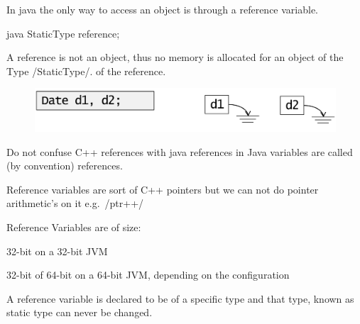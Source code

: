 \begin{defnbox}\nospacing
  \begin{defn}\label{defn:referenceVariable}
    In java the only way to access an object is through a reference variable.
    \begin{mintlinebox}{java}
      StaticType reference;
    \end{mintlinebox}
    A reference is not an object, thus no memory is allocated for an object of
    the Type \javainline/StaticType/.
    of the reference.
    \begin{figure}[H]
      \vspace{-5pt}
      \centering
      \includegraphics[width=.7\textwidth]{java/figures/basics/reference.png}
    \end{figure}
  \end{defn}
\end{defnbox}
\begin{notebox}[Note]\nospacing
  \begin{itemizenosep}
      \item Do not confuse C++ references with java references in Java variables are
  called (by convention) references.
      \item Reference variables are sort of C++ pointers but we can not do
    pointer arithmetic's on it e.g.\ \cppinline/ptr++/
      \item Reference Variables are of size:
    \begin{itemizenosep}
        \item 32-bit on a 32-bit JVM
        \item 32-bit of 64-bit on a 64-bit JVM, depending on the configuration
    \end{itemizenosep}
  \end{itemizenosep}
\end{notebox}
\begin{defnbox}\nospacing
  \begin{defn}\leavevmode
    A reference variable is declared to be of a specific type and that type,
    known as static type can never be changed.\leavevmode\\
  \end{defn}
\end{defnbox}
